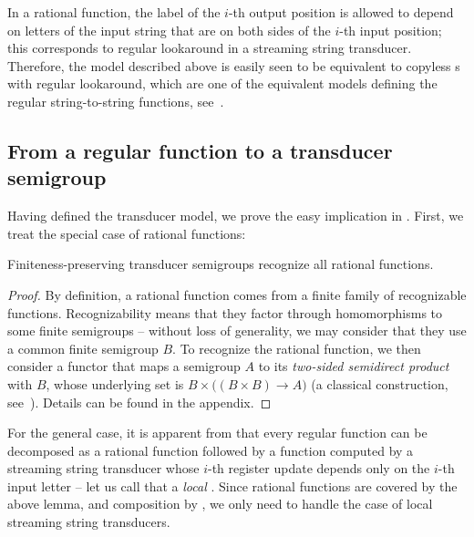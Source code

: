 In a rational function, the label of the $i$-th output position is allowed to depend on letters of the input string that are on both sides of the $i$-th input position; this corresponds to regular lookaround in a streaming string transducer. Therefore, the model described above is easily seen to be equivalent to copyless \sst{}s with regular lookaround, which are one of the equivalent models defining the regular string-to-string functions, see~\cite[Section~IV.C]{AlurFT12}.

\subsection{From a regular function to a transducer semigroup}
\label{sec:easy}

Having defined the transducer model, we prove the easy implication in
. First, we treat the special case of rational
functions:
\begin{lemma}\label{lem:rational-to-functor}
  Finiteness-preserving transducer semigroups recognize all rational functions.
\end{lemma}
\begin{proof}
  By definition, a rational function comes from a finite family of recognizable
  functions. Recognizability means that they factor through homomorphisms to
  some finite semigroups -- without loss of generality, we may consider that
  they use a common finite semigroup $B$. To recognize the rational function, we
  then consider a functor that maps a semigroup $A$ to its \emph{two-sided
    semidirect product} with $B$, whose underlying set is $B \times \big((B
  \times B) \to A\big)$ (a classical construction, see~\cite[Section
  6]{rhodes1989kernel}). Details can be found in the appendix.
\end{proof}

For the general case, it is apparent from  that every
regular function can be decomposed as a rational function followed by a function
computed by a streaming string transducer whose $i$-th register update depends
only on the $i$-th input letter -- let us call that a \emph{local} \sst. Since
rational functions are covered by the above lemma, and composition by
, we only need to handle the case of local streaming
string transducers.

